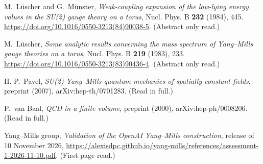 
M.~L\"uscher and G.~M\"unster, \emph{Weak-coupling expansion of the low-lying energy values in the SU(2) gauge theory on a torus},
Nucl. Phys. B \textbf{232} (1984), 445.
\url{https://doi.org/10.1016/0550-3213(84)90038-5}. (Abstract only read.)

M.~L\"uscher, \emph{Some analytic results concerning the mass spectrum of Yang--Mills gauge theories on a torus},
Nucl. Phys. B \textbf{219} (1983), 233.
\url{https://doi.org/10.1016/0550-3213(83)90436-4}. (Abstract only read.)

H.-P.~Pavel, \emph{SU(2) Yang--Mills quantum mechanics of spatially constant fields}, preprint (2007), arXiv:hep-th/0701283. (Read in full.)

P.~van Baal, \emph{QCD in a finite volume}, preprint (2000), arXiv:hep-ph/0008206. (Read in full.)

Yang--Mills group, \emph{Validation of the OpenAI Yang--Mills construction}, release of 10 November 2026,
\url{https://alexisdpc.github.io/yang-mills/references/assessment-1-2026-11-10.pdf}. (First page read.)
